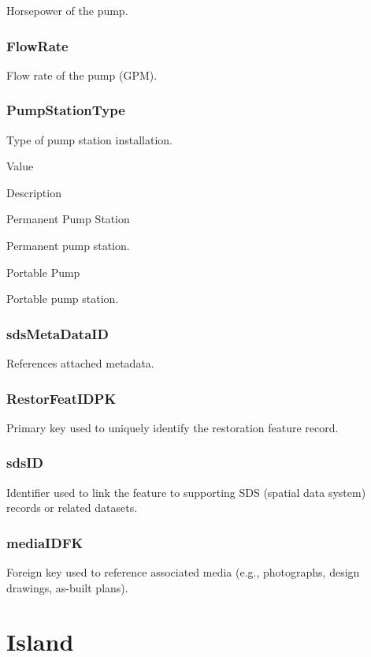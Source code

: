 \documentclass[
  letterpaper,
  DIV=11,
  numbers=noendperiod]{scrreprt}
\begin{document}
Horsepower of the pump.

\subsection{FlowRate}\label{flowrate}

Flow rate of the pump (GPM).

\subsection{PumpStationType}\label{pumpstationtype}

Type of pump station installation.

Value

Description

Permanent Pump Station

Permanent pump station.

Portable Pump

Portable pump station.

\subsection{sdsMetaDataID}\label{sdsmetadataid-6}

References attached metadata.

\subsection{RestorFeatIDPK}\label{restorfeatidpk-6}

Primary key used to uniquely identify the restoration feature record.

\subsection{sdsID}\label{sdsid-6}

Identifier used to link the feature to supporting SDS (spatial data
system) records or related datasets.

\subsection{mediaIDFK}\label{mediaidfk-6}

Foreign key used to reference associated media (e.g., photographs,
design drawings, as-built plans).

\chapter{Island}\label{island}
\end{document}
